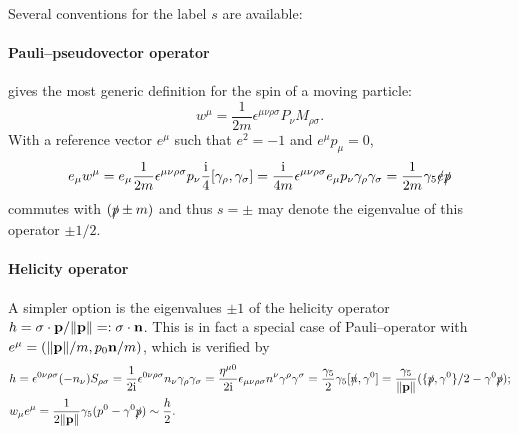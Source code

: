 \documentclass{CheatSheet}
\begin{document}
Several conventions for the label $s$ are available:\vspace{-1em}
\begin{DownPara}
\paragraph{Pauli--\Lubanski pseudovector operator} gives the most generic definition for the spin of a moving particle:
\begin{equation}
 w^\mu = \frac1{2m}\epsilon^{\mu\nu\rho\sigma}P_\nu M_{\rho\sigma}.
\end{equation}
With a reference vector $e^\mu$ such that $e^2=-1$ and $e^\mu p_\mu=0$,
\begin{equation}
 e_\mu w^\mu
= e_\mu \frac1{2m} \epsilon^{\mu\nu\rho\sigma}p_\nu \frac{{\mathrm{i}}}{4}[\gamma_\rho,\gamma_\sigma]
= \frac{{\mathrm{i}}}{4m} \epsilon^{\mu\nu\rho\sigma}e_\mu p_\nu \gamma_\rho\gamma_\sigma
= \frac1{2m}\gamma_5 \slashed e \slashed p
\end{equation}
commutes with $(\slashed p\pm m)$ and thus $s=\pm$ may denote the eigenvalue of this operator $\pm1/2$.


\paragraph{Helicity operator}
A simpler option is the eigenvalues $\pm1$ of the helicity operator $h={\mathbf{\sigma}}\cdot{\mathbf{p}}/\|{\mathbf{p}}\|=:{\mathbf{\sigma}}\cdot{\mathbf{n}}$.
This is in fact a special case of Pauli--\Lubanski operator with $e^\mu= (\|{\mathbf{p}}\|/m,p_0{\mathbf{n}}/m)$, which is verified by
\begin{align}
& h
=\epsilon^{0\nu\rho\sigma}(-n_\nu) S_{\rho\sigma}
=\frac{1}{2{\mathrm{i}}}\epsilon^{0\nu\rho\sigma}n_\nu \gamma_\rho\gamma_\sigma
=\frac{\eta^{\mu0}}{2{\mathrm{i}}}\epsilon_{\mu\nu\rho\sigma}n^\nu \gamma^\rho\gamma^\sigma
=\frac{\gamma_5}{2}\gamma_5[\slashed{n},\gamma^0]
=\frac{\gamma_5}{\|{\mathbf{p}}\|}({\{\slashed{p},\gamma^0\}}/{2}-\gamma^0\slashed{p});
\\&
w_\mu e^\mu 
=\frac{1}{2\|{\mathbf{p}}\|}\gamma_5(p^0-\gamma^0\slashed{p})\sim \frac{h}{2}.
\end{align}



\end{DownPara}
\end{document}
